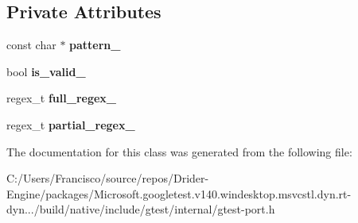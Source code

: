 \subsection*{Private Attributes}
\begin{DoxyCompactItemize}
\item 
\mbox{\label{classtesting_1_1internal_1_1_r_e_a44ab32241fab42db5b6f7482776658ec}} 
const char $\ast$ {\bfseries pattern\+\_\+}
\item 
\mbox{\label{classtesting_1_1internal_1_1_r_e_af9062fefab96529ff785f50097416d64}} 
bool {\bfseries is\+\_\+valid\+\_\+}
\item 
\mbox{\label{classtesting_1_1internal_1_1_r_e_a1627cf3c6e38a83518e7aefd659b938b}} 
regex\+\_\+t {\bfseries full\+\_\+regex\+\_\+}
\item 
\mbox{\label{classtesting_1_1internal_1_1_r_e_a1b3e42916c61db479ae90c7a96c22a58}} 
regex\+\_\+t {\bfseries partial\+\_\+regex\+\_\+}
\end{DoxyCompactItemize}


The documentation for this class was generated from the following file\+:\begin{DoxyCompactItemize}
\item 
C\+:/\+Users/\+Francisco/source/repos/\+Drider-\/\+Engine/packages/\+Microsoft.\+googletest.\+v140.\+windesktop.\+msvcstl.\+dyn.\+rt-\/dyn.../build/native/include/gtest/internal/gtest-\/port.\+h\end{DoxyCompactItemize}
